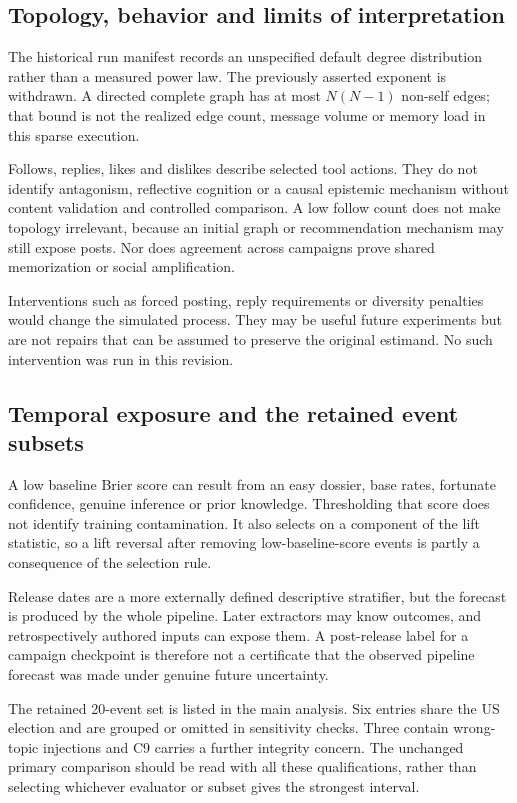\subsection{Topology, behavior and limits of interpretation}
The historical run manifest records an unspecified default degree distribution rather than a measured power law. The previously asserted exponent is withdrawn. A directed complete graph has at most $N(N-1)$ non-self edges; that bound is not the realized edge count, message volume or memory load in this sparse execution.

Follows, replies, likes and dislikes describe selected tool actions. They do not identify antagonism, reflective cognition or a causal epistemic mechanism without content validation and controlled comparison. A low follow count does not make topology irrelevant, because an initial graph or recommendation mechanism may still expose posts. Nor does agreement across campaigns prove shared memorization or social amplification.

Interventions such as forced posting, reply requirements or diversity penalties would change the simulated process. They may be useful future experiments but are not repairs that can be assumed to preserve the original estimand. No such intervention was run in this revision.

\subsection{Temporal exposure and the retained event subsets}
\label{sec:contamination}
\label{sec:cutoff}
A low baseline Brier score can result from an easy dossier, base rates, fortunate confidence, genuine inference or prior knowledge. Thresholding that score does not identify training contamination. It also selects on a component of the lift statistic, so a lift reversal after removing low-baseline-score events is partly a consequence of the selection rule.

Release dates are a more externally defined descriptive stratifier, but the forecast is produced by the whole pipeline. Later extractors may know outcomes, and retrospectively authored inputs can expose them. A post-release label for a campaign checkpoint is therefore not a certificate that the observed pipeline forecast was made under genuine future uncertainty.

The retained 20-event set is listed in the main analysis. Six entries share the US election and are grouped or omitted in sensitivity checks. Three contain wrong-topic injections and C9 carries a further integrity concern. The unchanged primary comparison should be read with all these qualifications, rather than selecting whichever evaluator or subset gives the strongest interval.


